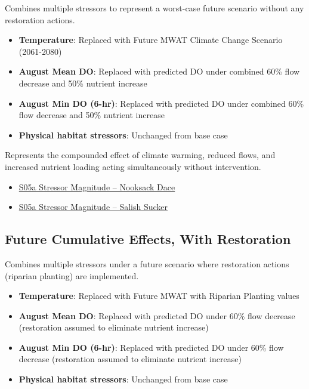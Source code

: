 \documentclass[
  letterpaper,
  DIV=11,
  numbers=noendperiod]{scrreprt}
\providecommand{\tightlist}{%
  \setlength{\itemsep}{0pt}\setlength{\parskip}{0pt}}
\begin{document}
Combines multiple stressors to represent a worst-case future scenario
without any restoration actions.

\begin{itemize}
\tightlist
\item
  \textbf{Temperature}: Replaced with Future MWAT Climate Change
  Scenario (2061-2080)
\item
  \textbf{August Mean DO}: Replaced with predicted DO under combined
  60\% flow decrease and 50\% nutrient increase
\item
  \textbf{August Min DO (6-hr)}: Replaced with predicted DO under
  combined 60\% flow decrease and 50\% nutrient increase
\item
  \textbf{Physical habitat stressors}: Unchanged from base case
\end{itemize}

Represents the compounded effect of climate warming, reduced flows, and
increased nutrient loading acting simultaneously without intervention.

\begin{itemize}
\tightlist
\item
  \href{./sample_data/ndss_nooksack_dace/S05a_Mid\%20Century\%20with\%20No\%20Restoration.xlsx}{S05a
  Stressor Magnitude -- Nooksack Dace}
\item
  \href{./sample_data/ndss_salish_sucker/S05a_Mid\%20Century\%20with\%20No\%20Restoration.xlsx}{S05a
  Stressor Magnitude -- Salish Sucker}
\end{itemize}

\subsection*{Future Cumulative Effects, With
Restoration}\label{future-cumulative-effects-with-restoration}

Combines multiple stressors under a future scenario where restoration
actions (riparian planting) are implemented.

\begin{itemize}
\tightlist
\item
  \textbf{Temperature}: Replaced with Future MWAT with Riparian Planting
  values
\item
  \textbf{August Mean DO}: Replaced with predicted DO under 60\% flow
  decrease (restoration assumed to eliminate nutrient increase)
\item
  \textbf{August Min DO (6-hr)}: Replaced with predicted DO under 60\%
  flow decrease (restoration assumed to eliminate nutrient increase)
\item
  \textbf{Physical habitat stressors}: Unchanged from base case
\end{itemize}
\end{document}
